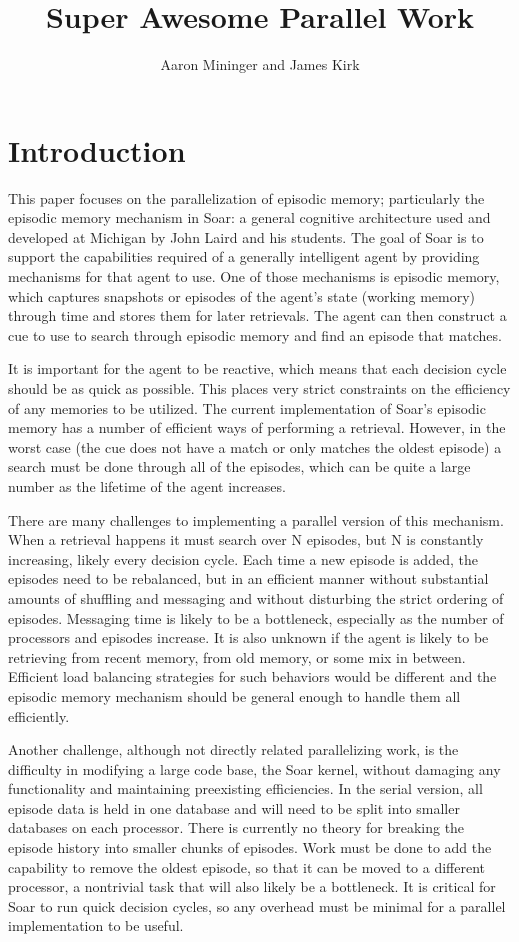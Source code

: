 \documentclass[11pt]{article} %
\title{Super Awesome Parallel Work}
\author{Aaron Mininger and James Kirk}
\begin{document}
\maketitle

\section{Introduction}
This paper focuses on the parallelization of episodic memory; particularly the
episodic memory mechanism in Soar: a general cognitive architecture used and
developed at Michigan by John Laird and his students. The goal of Soar is to
support the capabilities required of a generally intelligent agent by providing
mechanisms for that agent to use. One of those mechanisms is episodic memory,
which captures snapshots or episodes of the agent’s state (working memory)
through time and stores them for later retrievals. The agent can then construct
a cue to use to search through episodic memory and find an episode that matches.

It is important for the agent to be reactive, which means that each decision cycle
should be as quick as possible. This places very strict constraints on the
efficiency of any memories to be utilized. The current implementation of Soar’s
episodic memory has a number of efficient ways of performing a retrieval. However,
in the worst case (the cue does not have a match or only matches the oldest
episode) a search must be done through all of the episodes, which can be quite a
large number as the lifetime of the agent increases.
 
There are many challenges to implementing a parallel version of this mechanism.
 When a retrieval happens it must search over N episodes, but N is constantly 
increasing, likely every decision cycle. Each time a new episode is added, the 
episodes need to be rebalanced, but in an efficient manner without substantial 
amounts of shuffling and messaging and without disturbing the strict ordering
 of episodes. Messaging time is likely to be a bottleneck, especially as the 
number of processors and episodes increase. It is also unknown if the agent is 
likely to be retrieving from recent memory, from old memory, or some mix in 
between.  Efficient load balancing strategies for such behaviors would be 
different and the episodic memory mechanism should be general enough to handle 
them all efficiently.

Another challenge, although not directly related parallelizing work, is the difficulty in 
modifying a large code base, the Soar kernel, without damaging any 
functionality and maintaining preexisting efficiencies.  In the serial version,
 all episode data is held in one database and will need to be split into 
smaller databases on each processor.  There is currently no theory for breaking
 the episode history into smaller chunks of episodes. Work must be done to add 
the capability to remove the oldest episode, so that it can be moved to a 
different processor, a nontrivial task that will also likely be a bottleneck.  It is critical for Soar to run quick decision cycles, so 
any overhead must be minimal for a parallel implementation to be useful.
\end{document}
